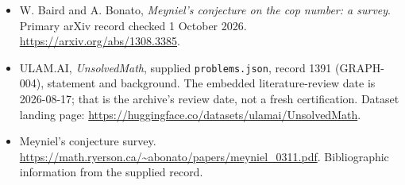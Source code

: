 \documentclass[11pt,a4paper]{article}
\begin{document}
{\small

\begin{itemize}
\item[E1] W. Baird and A. Bonato, \emph{Meyniel's conjecture on the cop number: a survey}. Primary arXiv record checked 1 October 2026. \url{https://arxiv.org/abs/1308.3385}.


\item[\hypertarget{source:1391:1}{S1}] ULAM.AI, \emph{UnsolvedMath}, supplied \texttt{problems.json}, record 1391 (GRAPH-004), statement and background. The embedded literature-review date is 2026-08-17; that is the archive’s review date, not a fresh certification. Dataset landing page: \url{https://huggingface.co/datasets/ulamai/UnsolvedMath}.

\item[\hypertarget{source:1391:2}{S2}] Meyniel's conjecture survey. \url{https://math.ryerson.ca/~abonato/papers/meyniel_0311.pdf}. Bibliographic information from the supplied record.

\end{itemize}

}

\label{end:1391}
\end{document}
